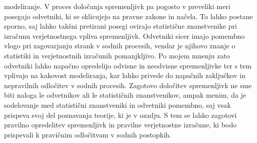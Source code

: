 \documentclass[fin1, tisk]{fmfdelo}
\theoremstyle{definition}
\theoremstyle{trditev}
\theoremstyle{izrek}
\begin{document}
modeliranje. V proces določanja spremenljivk pa pogosto v preveliki meri posegajo odvetniki, ki se sklicujejo na pravne zakone in načela. To lahko
postane sporno, saj lahko takšni pretirani posegi ovirajo statistične znanstvenike pri izračunu verjetnostnega vpliva spremenljivk. Odvetniki sicer
imajo pomembno vlogo pri zagovarjanju strank v sodnih procesih, vendar je njihovo znanje o statistiki in verjetnostnih izračunih pomanjkljivo. Po
mojem mnenju zato odvetniki lahko napačno opredelijo odvisne in neodvisne spremenljivke ter s tem vplivajo na kakovost modeliranja, kar lahko privede
do napačnih zaključkov in nepravilnih odločitev v sodnih procesih. Zagotovo določitev spremenljivk ne sme biti naloga le odvetnikov ali le statističnih
znanstvenikov, ampak menim, da je sodelovanje med statistični znanstveniki in odvetniki pomembno, saj vsak prispeva svoj del poznavanja teorije,
ki je v ozadju.  S tem se lahko zagotovi pravilno opredelitev spremenljivk in pravilne verjetnostne izračune, ki bodo prispevali k pravičnim
odločitvam v sodnih postopkih.

\end{document}

